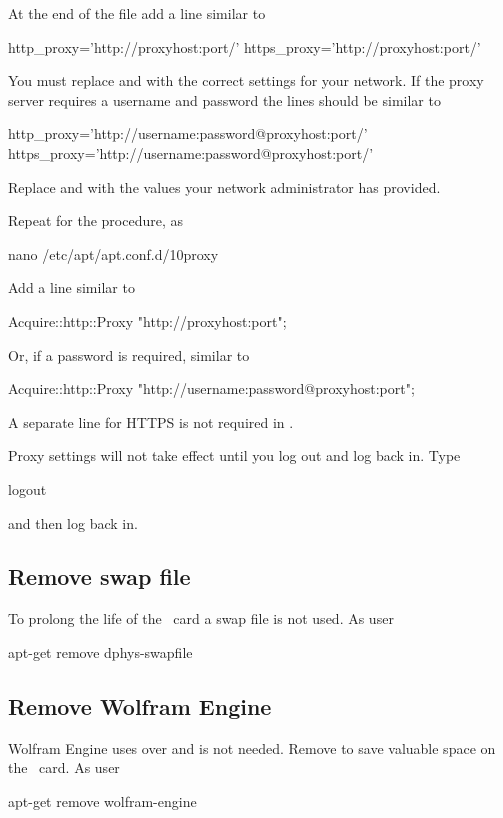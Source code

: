 At the end of the file add a line similar to
\begin{Cmd}
http_proxy='http://proxyhost:port/'
https_proxy='http://proxyhost:port/'
\end{Cmd}
You must replace  and  with the correct
settings for your network. If the proxy server requires a username and
password the lines should be similar to
\begin{Cmd}
http_proxy='http://username:password@proxyhost:port/'
https_proxy='http://username:password@proxyhost:port/'
\end{Cmd}
Replace  and  with the values your
network administrator has provided.

Repeat for the procedure, as \rootUser
\begin{Cmd}
nano /etc/apt/apt.conf.d/10proxy
\end{Cmd}

Add a line similar to
\begin{Cmd}
Acquire::http::Proxy "http://proxyhost:port";
\end{Cmd}
Or, if a password is required, similar to
\begin{Cmd}
Acquire::http::Proxy "http://username:password@proxyhost:port";
\end{Cmd}
A separate line for HTTPS is not required in
.

Proxy settings will not take effect until you log out and log back
in. Type
\begin{Cmd}
logout
\end{Cmd}
and then log back in.

\subsection{Remove swap file}
To prolong the life of the \sd\ card a swap file is not used. As user
\rootUser
\begin{Cmd}
apt-get remove dphys-swapfile  
\end{Cmd}

\subsection{Remove Wolfram Engine}
Wolfram Engine uses over  and is not needed. Remove to save
valuable space on the \sd\ card. As user \rootUser
\begin{Cmd}
apt-get remove wolfram-engine
\end{Cmd}

